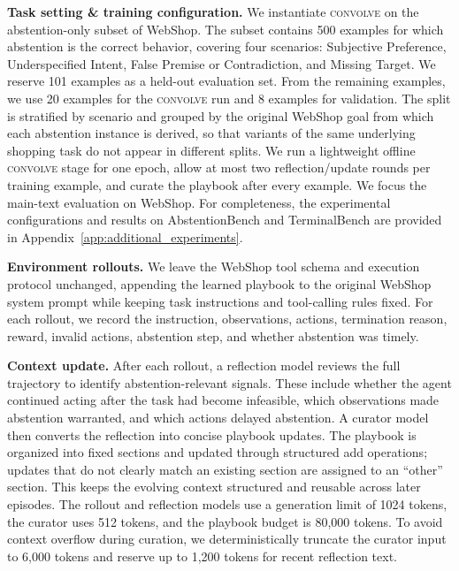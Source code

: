 \documentclass{llmxive}
\providecommand{\method}{\textsc{convolve}\xspace}
\begin{document}

\textbf{Task setting \& training configuration.}
We instantiate \method on the abstention-only subset of WebShop. The subset contains 500 examples for which abstention is the correct behavior, covering four scenarios: Subjective Preference, Underspecified Intent, False Premise or Contradiction, and Missing Target. We reserve 101 examples as a held-out evaluation set. From the remaining examples, we use 20 examples for the \method run and 8 examples for validation. The split is stratified by scenario and grouped by the original WebShop goal from which each abstention instance is derived, so that variants of the same underlying shopping task do not appear in different splits. We run a lightweight offline \method stage for one epoch, allow at most two reflection/update rounds per training example, and curate the playbook after every example. We focus the main-text evaluation on WebShop. For completeness, the experimental configurations and results on AbstentionBench and TerminalBench are provided in Appendix~\ref{app:additional_experiments}.

\textbf{Environment rollouts.}
We leave the WebShop tool schema and execution protocol unchanged, appending the learned playbook to the original WebShop system prompt while keeping task instructions and tool-calling rules fixed. For each rollout, we record the instruction, observations, actions, termination reason, reward, invalid actions, abstention step, and whether abstention was timely.

\textbf{Context update.}
After each rollout, a reflection model reviews the full trajectory to identify abstention-relevant signals. These include whether the agent continued acting after the task had become infeasible, which observations made abstention warranted, and which actions delayed abstention. A curator model then converts the reflection into concise playbook updates. The playbook is organized into fixed sections and updated through structured add operations; updates that do not clearly match an existing section are assigned to an ``other'' section. This keeps the evolving context structured and reusable across later episodes. The rollout and reflection models use a generation limit of 1024 tokens, the curator uses 512 tokens, and the playbook budget is 80,000 tokens. To avoid context overflow during curation, we deterministically truncate the curator input to 6,000 tokens and reserve up to 1,200 tokens for recent reflection text.
\end{document}
